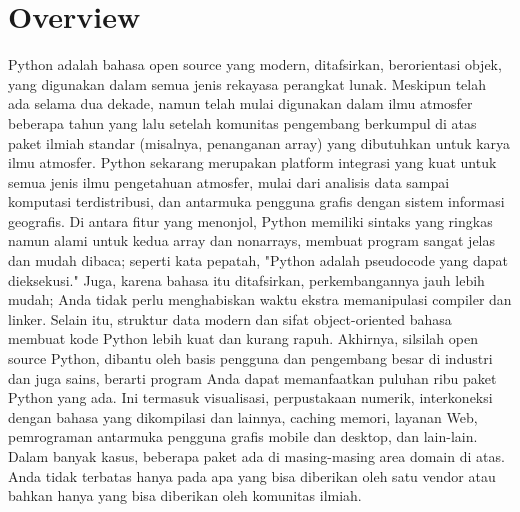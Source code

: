
\section{Overview}
Python adalah bahasa open source yang modern, ditafsirkan, berorientasi objek, yang digunakan dalam semua jenis rekayasa perangkat lunak. Meskipun telah ada selama dua dekade, namun telah mulai digunakan dalam ilmu atmosfer beberapa tahun yang lalu setelah komunitas pengembang berkumpul di atas paket ilmiah standar (misalnya, penanganan array) yang dibutuhkan untuk karya ilmu atmosfer. 
Python sekarang merupakan platform integrasi yang kuat untuk semua jenis ilmu pengetahuan atmosfer, mulai dari analisis data sampai komputasi terdistribusi, dan antarmuka pengguna grafis dengan sistem informasi geografis. Di antara fitur yang menonjol, 
Python memiliki sintaks yang ringkas namun alami untuk kedua array dan nonarrays, membuat program sangat jelas dan mudah dibaca; seperti kata pepatah, "Python adalah pseudocode yang dapat dieksekusi."
Juga, karena bahasa itu ditafsirkan, perkembangannya jauh lebih mudah; Anda tidak perlu menghabiskan waktu ekstra memanipulasi compiler dan linker. Selain itu, struktur data modern dan sifat object-oriented bahasa membuat kode Python lebih kuat dan kurang rapuh. Akhirnya, silsilah open source Python, dibantu oleh basis pengguna dan pengembang besar di industri dan juga sains, 
berarti program Anda dapat memanfaatkan puluhan ribu paket Python yang ada. Ini termasuk visualisasi, perpustakaan numerik, interkoneksi dengan bahasa yang dikompilasi dan lainnya, caching memori, layanan Web, pemrograman antarmuka pengguna grafis mobile dan desktop, 
dan lain-lain. Dalam banyak kasus, beberapa paket ada di masing-masing area domain di atas. Anda tidak terbatas hanya pada apa yang bisa diberikan oleh satu vendor atau bahkan hanya yang bisa diberikan oleh komunitas ilmiah.

